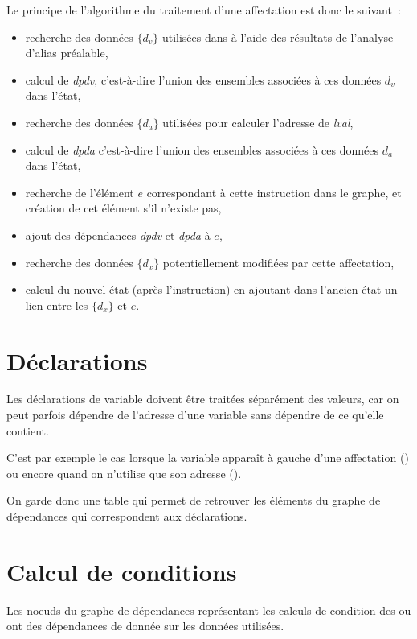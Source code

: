 Le principe de l'algorithme du traitement d'une affectation
 est donc le suivant~:

\begin{itemize}
\item recherche des données $\{d_v\}$
utilisées dans  à l'aide des résultats de l'analyse d'alias préalable,
\item calcul de {\it dpdv},
c'est-à-dire l'union des ensembles associées à ces données $d_v$ dans l'état,
\item recherche des données $\{d_a\}$
utilisées pour calculer l'adresse de {\it lval},
\item calcul de {\it dpda}
c'est-à-dire l'union des ensembles associées à ces données $d_a$ dans l'état,
\item recherche de l'élément $e$
correspondant à cette instruction dans le graphe,
      et création de cet élément s'il n'existe pas,
\item ajout des dépendances {\it dpdv} et  {\it dpda} à $e$,
\item recherche des données $\{d_x\}$
potentiellement modifiées par cette affectation,
\item calcul du nouvel état (après l'instruction)
en ajoutant dans l'ancien état un lien entre les $\{d_x\}$ et $e$.
\end{itemize}

\section{Déclarations}

Les déclarations de variable doivent être traitées séparément
des valeurs, car on peut parfois dépendre de l'adresse d'une variable
sans dépendre de ce qu'elle contient.

C'est par exemple le cas lorsque la variable apparaît à gauche
d'une affectation ()
ou encore quand on n'utilise que son adresse ().

On garde donc une table qui permet de retrouver les éléments
du graphe de dépendances qui correspondent aux déclarations.


\section{Calcul de conditions}

Les noeuds du graphe de dépendances représentant
les calculs de condition des  ou 
ont des dépendances de donnée sur les données utilisées.

